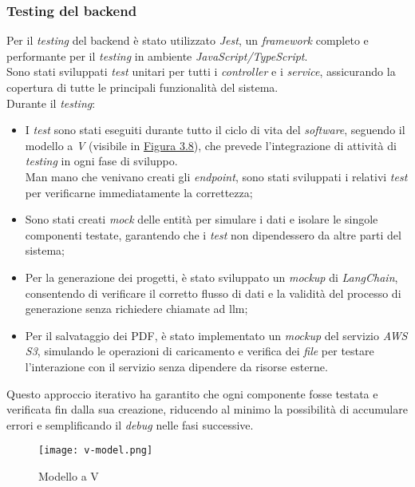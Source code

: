 \subsubsection{Testing del \gls{backend}}  
Per il \textit{testing} del \gls{backend} è stato utilizzato \textit{Jest}, un \textit{framework} completo e performante per il \textit{testing} in ambiente \textit{JavaScript/TypeScript}.\\
Sono stati sviluppati \textit{test} unitari per tutti i \textit{controller} e i \textit{service}, assicurando la copertura di tutte le principali funzionalità del sistema.\\

\noindent Durante il \textit{testing}:
\begin{itemize}
    \item I \textit{test} sono stati eseguiti durante tutto il ciclo di vita del \textit{software}, seguendo il modello a \textit{V} (visibile in {\hyperref[fig:v-model]{Figura 3.8}}), che prevede l’integrazione di attività di \textit{testing} in ogni fase di sviluppo.\\
    Man mano che venivano creati gli \textit{endpoint}, sono stati sviluppati i relativi \textit{test} per verificarne immediatamente la correttezza;
    \item Sono stati creati \textit{mock} delle entità per simulare i dati e isolare le singole componenti testate, garantendo che i \textit{test} non dipendessero da altre parti del sistema;
    \item Per la generazione dei progetti, è stato sviluppato un \textit{mockup} di \textit{LangChain}, consentendo di verificare il corretto flusso di dati e la validità del processo di generazione senza richiedere chiamate ad \gls{llm};
    \item Per il salvataggio dei PDF, è stato implementato un \textit{mockup} del servizio \textit{AWS S3}, simulando le operazioni di caricamento e verifica dei \textit{file} per testare l’interazione con il servizio senza dipendere da risorse esterne.
\end{itemize}

\noindent Questo approccio iterativo ha garantito che ogni componente fosse testata e verificata fin dalla sua creazione, riducendo al minimo la possibilità di accumulare errori e semplificando il \textit{debug} nelle fasi successive.\\

\begin{figure}[H]
    \centering
    \texttt{[image: v-model.png]}
    \caption{Modello a V}
    \label{fig:v-model}  
    \cite{site:v-model}
\end{figure}

